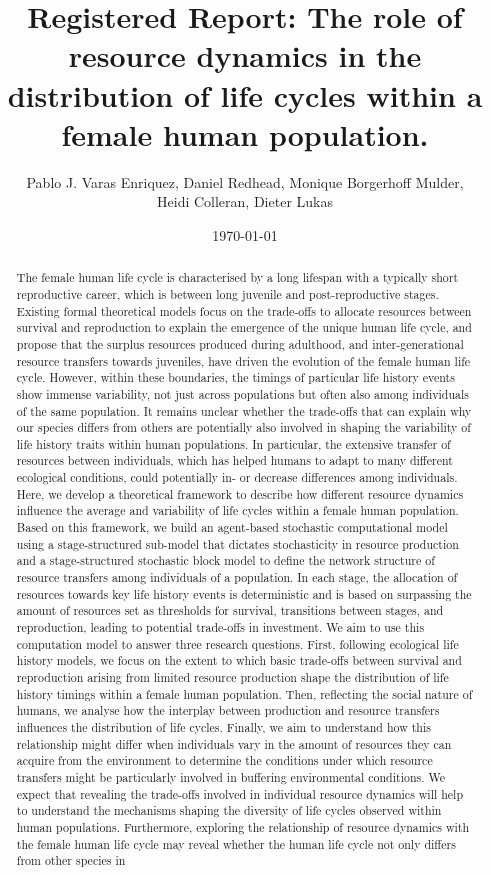 \documentclass{article}
\title{Registered Report: The role of resource dynamics in the distribution of life cycles within a female human population.
}
\author{Pablo J. Varas Enriquez, Daniel Redhead, Monique Borgerhoff Mulder,
\\
Heidi Colleran, Dieter Lukas}
\date{\today}
\begin{document}
\maketitle

\tableofcontents

\begin{abstract}
    The female human life cycle is characterised by a long lifespan with a typically short reproductive career, which is between long juvenile and post-reproductive stages. Existing formal theoretical models focus on the trade-offs to allocate resources between survival and reproduction to explain the emergence of the unique human life cycle, and propose that the surplus resources produced during adulthood, and inter-generational resource transfers towards juveniles, have driven the evolution of the female human life cycle. However, within these boundaries, the timings of particular life history events show immense variability, not just across populations but often also among individuals of the same population. It remains unclear whether the trade-offs that can explain why our species differs from others are potentially also involved in shaping the variability of life history traits within human populations. In particular, the extensive transfer of resources between individuals, which has helped humans to adapt to many different ecological conditions, could potentially in- or decrease differences among individuals. Here, we develop a theoretical framework to describe how different resource dynamics influence the average and variability of life cycles within a female human population. Based on this framework, we build an agent-based stochastic computational model using a stage-structured sub-model that dictates stochasticity in resource production and a stage-structured stochastic block model to define the network structure of resource transfers among individuals of a population. In each stage, the allocation of resources towards key life history events is deterministic and is based on surpassing the amount of resources set as thresholds for survival, transitions between stages, and reproduction, leading to potential trade-offs in investment. We aim to use this computation model to answer three research questions. First, following ecological life history models, we focus on the extent to which basic trade-offs between survival and reproduction arising from limited resource production shape the distribution of life history timings within a female human population. Then, reflecting the social nature of humans, we analyse how the interplay between production and resource transfers influences the distribution of life cycles. Finally, we aim to understand how this relationship might differ when individuals vary in the amount of resources they can acquire from the environment to determine the conditions under which resource transfers might be particularly involved in buffering environmental conditions. We expect that revealing the trade-offs involved in individual resource dynamics will help to understand the mechanisms shaping the diversity of life cycles observed within human populations. Furthermore, exploring the relationship of resource dynamics with the female human life cycle may reveal whether the human life cycle not only differs from other species in 
\end{abstract}
\end{document}
